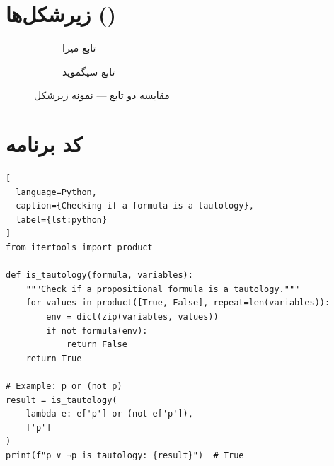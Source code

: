 \documentclass[12pt,a4paper,twoside]{book}
\begin{document}
\section{زیرشکل‌ها ()}
\label{sec:subfigs}

\begin{figure}[htbp]
  \centering
  \begin{subfigure}[b]{0.45\textwidth}
    \centering
    \caption{تابع میرا}
    \label{fig:sub1}
  \end{subfigure}
  \hfill
  \begin{subfigure}[b]{0.45\textwidth}
    \centering
    \caption{تابع سیگموید}
    \label{fig:sub2}
  \end{subfigure}
  \caption{مقایسه دو تابع — نمونه زیرشکل}
  \label{fig:subfigs}
\end{figure}

\section{کد برنامه}
\label{sec:code}

\begin{latin}
\begin{lstlisting}[
  language=Python,
  caption={Checking if a formula is a tautology},
  label={lst:python}
]
from itertools import product

def is_tautology(formula, variables):
    """Check if a propositional formula is a tautology."""
    for values in product([True, False], repeat=len(variables)):
        env = dict(zip(variables, values))
        if not formula(env):
            return False
    return True

# Example: p or (not p)
result = is_tautology(
    lambda e: e['p'] or (not e['p']),
    ['p']
)
print(f"p ∨ ¬p is tautology: {result}")  # True
\end{lstlisting}
\end{latin}
\end{document}
